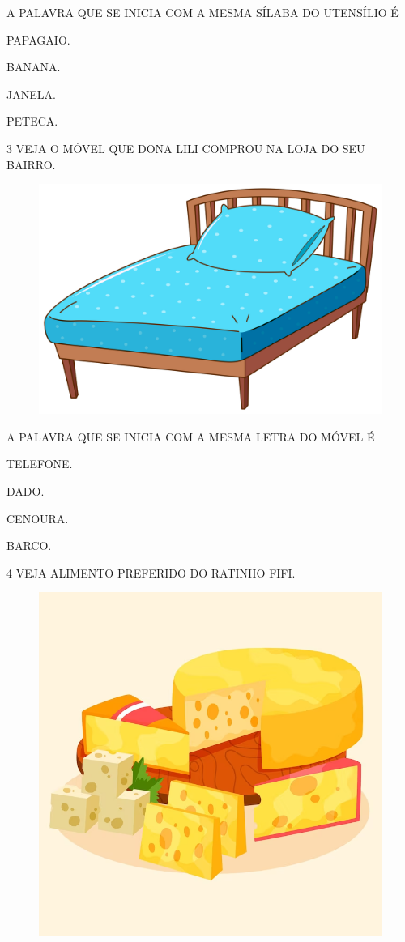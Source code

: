 A PALAVRA QUE SE INICIA COM A MESMA SÍLABA DO UTENSÍLIO É

\begin{multicols}{2}
\begin{escolha}
\item PAPAGAIO.

\item BANANA.

\item JANELA.

\item PETECA.
\end{escolha}
\end{multicols}

\pagebreak
\num{3} VEJA O MÓVEL QUE DONA LILI COMPROU NA LOJA DO SEU BAIRRO.

\begin{figure}[H]
\centering
\includegraphics[width=.6\textwidth]{./media/image212.jpg}
\end{figure}

A PALAVRA QUE SE INICIA COM A MESMA LETRA DO MÓVEL É

\begin{multicols}{2}
\begin{escolha}

\item TELEFONE.

\item DADO.

\item CENOURA.

\item BARCO.
\end{escolha}
\end{multicols}

\num{4} VEJA ALIMENTO PREFERIDO DO RATINHO FIFI.

\begin{figure}[H]
\centering
\includegraphics[width=.5\textwidth]{./media/image213.png}
\end{figure}

